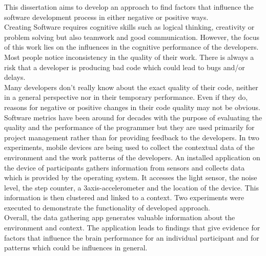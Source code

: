 \documentclass[a4paper, 12pt, oneside]{report}    	%
\begin{document}
\begin{thesisabstract}
%      
This dissertation aims to develop an approach to find factors that influence the software development process in either negative or positive ways.\\
Creating Software requires cognitive skills such as logical thinking, creativity or problem solving but also teamwork and good communication. 
However, the focus of this work lies on the influences in the cognitive performance of the developers.\\ 
Most people notice inconsistency in the quality of their work. There is always a risk that a developer is producing bad code which could lead to bugs and/or delays.\\
Many developers don't really know about the exact quality of their code, neither in a general perspective nor in their temporary performance. Even if they do, reasons for negative or positive changes in their code quality may not be obvious.\\
Software metrics have been around for decades with the purpose of evaluating the quality and the performance of the programmer but they are used primarily for project management rather than for providing feedback to the developers.
\bigbreak
In two experiments, mobile devices are being used to collect the contextual data of the environment and the work patterns of the developers. 
An installed application on the device of participants gathers information from sensors and collects data which is provided by the operating system. It accesses the light sensor, the noise level, the step counter, a 3axis-accelerometer and the location of the device. This information is then clustered and linked to a context.
\bigbreak
Two experiments were executed to demonstrate the functionality of developed approach.\\
Overall, the data gathering app generates valuable information about the environment and context. 
The application leads to findings that give evidence for factors that influence the brain performance for an individual participant and for patterns which could be influences in general. 
\end{thesisabstract}

\tableofcontents 
\listoftables                                     			%
\listoffigures                                    			%

                                
                            






\end{document}
